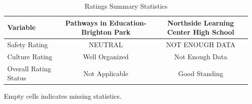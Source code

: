 \begin{table}[H]
\renewcommand{\arraystretch}{1.5}
\caption*{
{\large Ratings Summary Statistics}
} 

\fontsize{10pt}{11pt}\selectfont

\begin{tabular*}{\linewidth}{@{\extracolsep{\fill}}lcc}
\toprule
Variable & Pathways in Education- Brighton Park & Northside Learning Center High School \\ 
\midrule\addlinespace[2.5pt]
Safety Rating & NEUTRAL & NOT ENOUGH DATA \\
Culture Rating & Well Organized & Not Enough Data \\
Overall Rating Status & Not Applicable & Good Standing \\
\bottomrule
\end{tabular*}
\begin{minipage}{\linewidth}
Empty cells indicates missing statistics.\\
\end{minipage}
\end{table}
